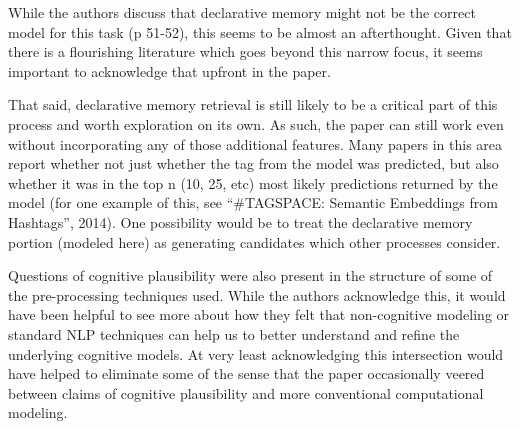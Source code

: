 \documentclass[answers,12pt]{exam}
\begin{document}
\begin{questions}
\begin{solution}
\end{solution}

\question While the authors discuss that declarative memory might not be the correct model for this task (p 51-52), this seems to be almost an afterthought. Given that there is a flourishing literature which goes beyond this narrow focus, it seems important to acknowledge that upfront in the paper.

\begin{solution}

\end{solution}


\question That said, declarative memory retrieval is still likely to be a critical part of this process and worth exploration on its own. As such, the paper can still work even without incorporating any of those additional features. Many papers in this area report whether not just whether the tag from the model was predicted, but also whether it was in the top n (10, 25, etc) most likely predictions returned by the model (for one example of this, see ``\#TAGSPACE: Semantic Embeddings from Hashtags'', 2014). One possibility would be to treat the declarative memory portion (modeled here) as generating candidates which other processes consider.

\begin{solution}

\end{solution}

\question Questions of cognitive plausibility were also present in the structure of some of the pre-processing techniques used. While the authors acknowledge this, it would have been helpful to see more about how they felt that non-cognitive modeling or standard NLP techniques can help us to better understand and refine the underlying cognitive models. At very least acknowledging this intersection would have helped to eliminate some of the sense that the paper occasionally veered between claims of cognitive plausibility and more conventional computational modeling.

\begin{solution}
\end{solution}

\end{questions}
\end{document}
